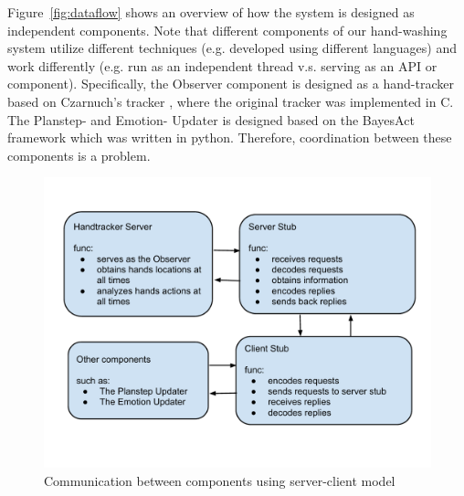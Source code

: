 Figure~\ref{fig:dataflow} shows an overview of how the system is designed as independent components. Note that different components of our hand-washing system utilize different techniques (e.g. developed using different languages) and work differently (e.g. run as an independent thread v.s. serving as an API or component). Specifically, the Observer component is designed as a hand-tracker based on Czarnuch's tracker \cite{czarnuch2014}, where the original tracker was implemented in C. The Planstep- and Emotion- Updater is designed based on the BayesAct framework \cite{hoey2013bayesian} which was written in python. Therefore, coordination between these components is a problem. 


\begin{figure}[htp]
\centering
\includegraphics[trim = 6mm 22mm 6mm 18mm, clip, width=0.9\linewidth]{fig/fig-communication.pdf}
\caption{Communication between components using server-client model}
\label{fig:communication}
\end{figure}

